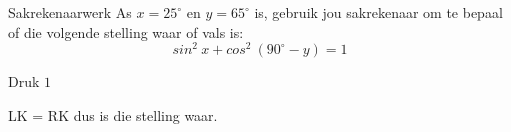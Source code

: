 \begin{wex}
{Sakrekenaarwerk}
{As $x=25^{\circ}$ en $y=65^{\circ}$ is, gebruik jou sakrekenaar om te bepaal of die volgende stelling waar of vals is:
\begin{equation*}
sin^{2}~x + cos^{2}~(90^{\circ}-y) = 1
\end{equation*}
}
{
Druk \fbox{(}   \fbox{)}  \fbox{\LARGE +} \fbox{(}  \fbox{(}  \fbox{\LARGE -}  \fbox{)} \fbox{)}   \fbox{\LARGE =} $1$


LK = RK dus is die stelling waar.



}
\end{wex}


